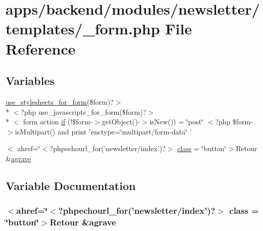 \hypertarget{backend_2modules_2newsletter_2templates_2__form_8php}{\section{apps/backend/modules/newsletter/templates/\-\_\-form.php File Reference}
\label{backend_2modules_2newsletter_2templates_2__form_8php}
}
\subsection*{Variables}
\begin{DoxyCompactItemize}
\item 
\hyperlink{live_2modules_2user_2templates_2__form_8php_a86bc4522fdbe625b07bc4a4d6eec3df7}{use\-\_\-stylesheets\-\_\-for\-\_\-form}(\$form)?$>$\\*
$<$?php use\-\_\-javascripts\-\_\-for\-\_\-form(\$form)?$>$\\*
$<$ form action \hyperlink{backend_2modules_2newsletter_2templates_2__form_8php_abd1acf0179bbb4a56e04d4fccdbc121f}{if} (!\$form-\/$>$get\-Object()-\/$>$is\-New()) = \char`\"{}post\char`\"{} $<$?php \$form-\/$>$is\-Multipart() and print 'enctype=\char`\"{}multipart/form-\/data\char`\"{} '
\item 
$<$ ahref=\char`\"{}$<$?phpechourl\-\_\-for('newsletter/index')?$>$ \hyperlink{backend_2modules_2newsletter_2templates_2__form_8php_afa5dd1e8e3a988ac87f00a2a51f59c5c}{class} = \char`\"{}button\char`\"{}$>$Retour \&\hyperlink{presse_2modules_2page_2templates_2concours_ouikos_success_8php_adcbedde811e3c81b65c252edf38caea2}{agrave}
\end{DoxyCompactItemize}


\subsection{Variable Documentation}
\hypertarget{backend_2modules_2newsletter_2templates_2__form_8php_afa5dd1e8e3a988ac87f00a2a51f59c5c}{
\subsubsection[{class}]{\setlength{\rightskip}{0pt plus 5cm}$<$ahref=\char`\"{}$<$?phpechourl\-\_\-for('newsletter/index')?$>$ class = \char`\"{}button\char`\"{}$>$Retour \&{\bf agrave}}}\label{backend_2modules_2newsletter_2templates_2__form_8php_afa5dd1e8e3a988ac87f00a2a51f59c5c}


